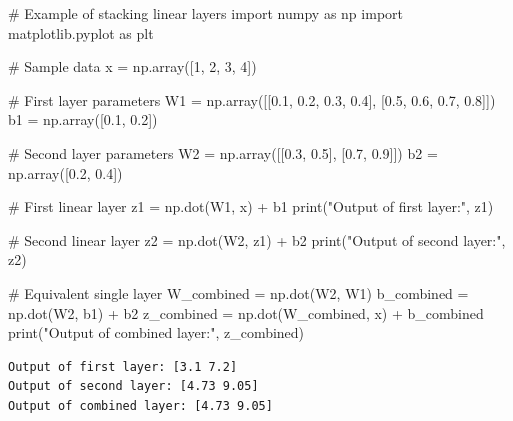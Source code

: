 \documentclass[
  letterpaper,
  DIV=11,
  numbers=noendperiod]{scrreprt}
\newenvironment{Shaded}{\begin{snugshade}}{\end{snugshade}}
\newcommand{\BuiltInTok}[1]{\textcolor[rgb]{0.00,0.23,0.31}{#1}}
\newcommand{\CommentTok}[1]{\textcolor[rgb]{0.37,0.37,0.37}{#1}}
\newcommand{\DecValTok}[1]{\textcolor[rgb]{0.68,0.00,0.00}{#1}}
\newcommand{\FloatTok}[1]{\textcolor[rgb]{0.68,0.00,0.00}{#1}}
\newcommand{\ImportTok}[1]{\textcolor[rgb]{0.00,0.46,0.62}{#1}}
\newcommand{\NormalTok}[1]{\textcolor[rgb]{0.00,0.23,0.31}{#1}}
\newcommand{\OperatorTok}[1]{\textcolor[rgb]{0.37,0.37,0.37}{#1}}
\newcommand{\StringTok}[1]{\textcolor[rgb]{0.13,0.47,0.30}{#1}}
\begin{document}
\begin{Shaded}
\begin{Highlighting}[]
\CommentTok{\# Example of stacking linear layers}
\ImportTok{import}\NormalTok{ numpy }\ImportTok{as}\NormalTok{ np}
\ImportTok{import}\NormalTok{ matplotlib.pyplot }\ImportTok{as}\NormalTok{ plt}

\CommentTok{\# Sample data}
\NormalTok{x }\OperatorTok{=}\NormalTok{ np.array([}\DecValTok{1}\NormalTok{, }\DecValTok{2}\NormalTok{, }\DecValTok{3}\NormalTok{, }\DecValTok{4}\NormalTok{])}

\CommentTok{\# First layer parameters}
\NormalTok{W1 }\OperatorTok{=}\NormalTok{ np.array([[}\FloatTok{0.1}\NormalTok{, }\FloatTok{0.2}\NormalTok{, }\FloatTok{0.3}\NormalTok{, }\FloatTok{0.4}\NormalTok{], }
\NormalTok{               [}\FloatTok{0.5}\NormalTok{, }\FloatTok{0.6}\NormalTok{, }\FloatTok{0.7}\NormalTok{, }\FloatTok{0.8}\NormalTok{]])}
\NormalTok{b1 }\OperatorTok{=}\NormalTok{ np.array([}\FloatTok{0.1}\NormalTok{, }\FloatTok{0.2}\NormalTok{])}

\CommentTok{\# Second layer parameters}
\NormalTok{W2 }\OperatorTok{=}\NormalTok{ np.array([[}\FloatTok{0.3}\NormalTok{, }\FloatTok{0.5}\NormalTok{], }
\NormalTok{               [}\FloatTok{0.7}\NormalTok{, }\FloatTok{0.9}\NormalTok{]])}
\NormalTok{b2 }\OperatorTok{=}\NormalTok{ np.array([}\FloatTok{0.2}\NormalTok{, }\FloatTok{0.4}\NormalTok{])}

\CommentTok{\# First linear layer}
\NormalTok{z1 }\OperatorTok{=}\NormalTok{ np.dot(W1, x) }\OperatorTok{+}\NormalTok{ b1}
\BuiltInTok{print}\NormalTok{(}\StringTok{"Output of first layer:"}\NormalTok{, z1)}

\CommentTok{\# Second linear layer}
\NormalTok{z2 }\OperatorTok{=}\NormalTok{ np.dot(W2, z1) }\OperatorTok{+}\NormalTok{ b2}
\BuiltInTok{print}\NormalTok{(}\StringTok{"Output of second layer:"}\NormalTok{, z2)}

\CommentTok{\# Equivalent single layer}
\NormalTok{W\_combined }\OperatorTok{=}\NormalTok{ np.dot(W2, W1)}
\NormalTok{b\_combined }\OperatorTok{=}\NormalTok{ np.dot(W2, b1) }\OperatorTok{+}\NormalTok{ b2}
\NormalTok{z\_combined }\OperatorTok{=}\NormalTok{ np.dot(W\_combined, x) }\OperatorTok{+}\NormalTok{ b\_combined}
\BuiltInTok{print}\NormalTok{(}\StringTok{"Output of combined layer:"}\NormalTok{, z\_combined)}
\end{Highlighting}
\end{Shaded}

\begin{verbatim}
Output of first layer: [3.1 7.2]
Output of second layer: [4.73 9.05]
Output of combined layer: [4.73 9.05]
\end{verbatim}
\end{document}
